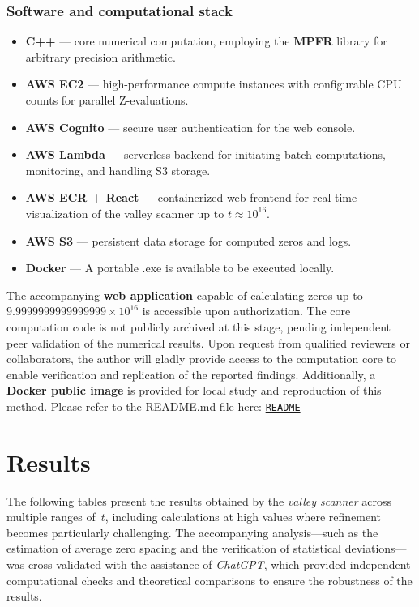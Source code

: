 \documentclass[11pt,a4paper]{article}
\begin{document}
\subsubsection*{Software and computational stack}

\begin{itemize}
    \item \textbf{C++} — core numerical computation, employing the \textbf{MPFR} library for arbitrary precision arithmetic.
    \item \textbf{AWS EC2} — high-performance compute instances with configurable CPU counts for parallel Z-evaluations.
    \item \textbf{AWS Cognito} — secure user authentication for the web console.
    \item \textbf{AWS Lambda} — serverless backend for initiating batch computations, monitoring, and handling S3 storage.
    \item \textbf{AWS ECR + React} — containerized web frontend for real-time visualization of the valley scanner up to \( t \approx 10^{16} \).
    \item \textbf{AWS S3} — persistent data storage for computed zeros and logs.
    \item \textbf{Docker} — A portable .exe is available to be executed locally.
\end{itemize}

\noindent
The accompanying \textbf{web application} capable of calculating zeros up to \( 9.9999999999999999 \times 10^{16} \) is accessible upon authorization.  
The core computation code is not publicly archived at this stage, pending independent peer validation of the numerical results.
Upon request from qualified reviewers or collaborators, 
the author will gladly provide access to the computation core to enable verification and replication of the reported findings.  Additionally, a \textbf{Docker public image} is provided for local study and reproduction of this method.  Please refer to the README.md file here:
\noindent
\href{https://github.com/zjore/z-research/blob/main/README.md}{\texttt{README}}

\section{Results}
\noindent
The following tables present the results obtained by the \emph{valley scanner} across multiple ranges of~$t$, 
including calculations at high values where refinement becomes particularly challenging. 
The accompanying analysis---such as the estimation of average zero spacing and the verification of statistical deviations---was cross-validated with the assistance of \textit{ChatGPT}, 
which provided independent computational checks and theoretical comparisons to ensure the robustness of the results.
\end{document}
